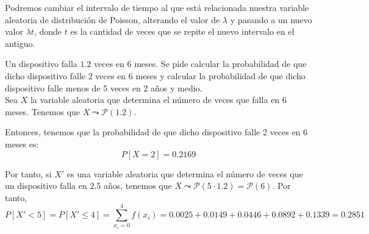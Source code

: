 \begin{observacion}
    Podremos cambiar el intervalo de tiempo al que está relacionada nuestra variable aleatoria de distribución de Poisson, alterando el valor de $\lambda$ y pasando a un nuevo valor $\lambda t$, donde $t$ es la cantidad de veces que se repite el nuevo intervalo en el antiguo.
\end{observacion}
\begin{ejemplo}
    Un dispositivo falla $1.2$ veces en 6 meses. Se pide calcular la probabilidad de que dicho dispositivo falle 2 veces en 6 meses y calcular la probabilidad de que dicho dispositivo falle menos de 5 veces en 2 años y medio.\\

    Sea $X$ la variable aleatoria que determina el número de veces que falla en 6 meses. Tenemos que $X\leadsto \mathcal{P}(1.2)$.

    Entonces, tenemos que la probabilidad de que dicho dispositivo falle 2 veces en 6 meses es:
    \begin{equation*}
        P[X=2]=0.2169
    \end{equation*}

    Por tanto, si $X'$ es una variable aleatoria que determina el número de veces que un dispositivo falla en $2.5$ años, tenemos que $X\leadsto \mathcal{P}(5\cdot 1.2)=\mathcal{P}(6)$. Por tanto,
    \begin{equation*}
        P[X'< 5] =P[X'\leq 4]=\sum_{x_i=0}^4f(x_i) = 0.0025 + 0.0149 + 0.0446 +0.0892+0.1339=0.2851
    \end{equation*}
\end{ejemplo}